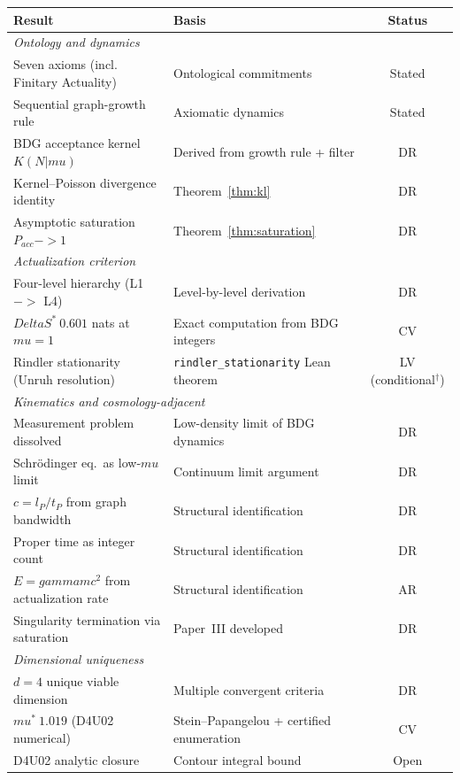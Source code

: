 \documentclass[11pt]{article}
\def\ell{l}%
\def\Delta{Delta}%
\def\mu{mu}%
\def\gamma{gamma}%
\def\mathrm#1{#1}%
\def\mathbf#1{#1}%
\def\approx{~}%
\def\to{->}%
\begin{document}
\begin{center}
\begin{tabular}{llc}
\toprule
Result & Basis & Status \\
\midrule
\multicolumn{3}{l}{\textit{Ontology and dynamics}} \\
Seven axioms (incl. Finitary Actuality) & Ontological commitments & Stated \\
Sequential graph-growth rule & Axiomatic dynamics & Stated \\
BDG acceptance kernel $K(\mathbf{N}|\mu)$ & Derived from growth rule + filter & DR \\
Kernel--Poisson divergence identity & Theorem~\ref{thm:kl} & DR \\
Asymptotic saturation $P_{\mathrm{acc}}\to 1$ & Theorem~\ref{thm:saturation} & DR \\
\midrule
\multicolumn{3}{l}{\textit{Actualization criterion}} \\
Four-level hierarchy (L1 $\to$ L4) & Level-by-level derivation & DR \\
$\Delta S^*\approx 0.601$ nats at $\mu=1$ & Exact computation from BDG integers & CV \\
Rindler stationarity (Unruh resolution) & \texttt{rindler\_stationarity} Lean theorem & LV (conditional$^\dagger$) \\
\midrule
\multicolumn{3}{l}{\textit{Kinematics and cosmology-adjacent}} \\
Measurement problem dissolved & Low-density limit of BDG dynamics & DR \\
Schr\"odinger eq.\ as low-$\mu$ limit & Continuum limit argument & DR \\
$c=\ell_P/t_P$ from graph bandwidth & Structural identification & DR \\
Proper time as integer count & Structural identification & DR \\
$E=\gamma m c^2$ from actualization rate & Structural identification & AR \\
Singularity termination via saturation & Paper~III developed & DR \\
\midrule
\multicolumn{3}{l}{\textit{Dimensional uniqueness}} \\
$d=4$ unique viable dimension & Multiple convergent criteria & DR \\
$\mu^*\approx 1.019$ (D4U02 numerical) & Stein--Papangelou + certified enumeration & CV \\
D4U02 analytic closure & Contour integral bound & Open \\

\end{tabular}
\end{center}
\end{document}
